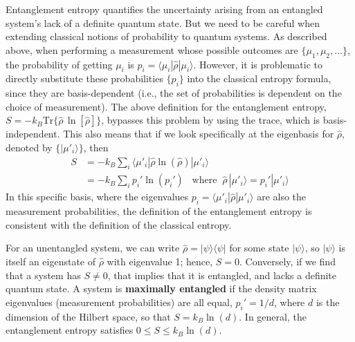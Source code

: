 \documentclass[pra,11pt]{revtex4}
\begin{document}
Entanglement entropy quantifies the uncertainty arising from an
entangled system's lack of a definite quantum state.  But we need to
be careful when extending classical notions of probability to quantum
systems.  As described above, when performing a measurement whose
possible outcomes are $\{\mu_1, \mu_2, \dots\}$, the probability of
getting $\mu_i$ is $p_i = \langle \mu_i | \hat{\rho}|\mu_i\rangle$.
However, it is problematic to directly substitute these probabilities
$\{p_i\}$ into the classical entropy formula, since they are
basis-dependent (i.e., the set of probabilities is dependent on the
choice of measurement).  The above definition for the entanglement
entropy, $S = - k_B \mathrm{Tr} \big\{ \hat{\rho}\, \ln[\hat{\rho}]
\big\}$, bypasses this problem by using the trace, which is
basis-independent.  This also means that if we look specifically at
the eigenbasis for $\hat{\rho}$, denoted by $\{|\mu'_i\rangle\}$, then
$$\begin{aligned}S &= -k_B \sum_i \langle \mu'_i | \hat{\rho}\ln(\hat{\rho}) | \mu'_i\rangle  \\ &= - k_B \sum_i p_i' \ln(p_i') \;\;\;\mathrm{where}\;\;\hat{\rho}\,|\mu'_i\rangle = p_i' |\mu'_i\rangle\end{aligned}$$
In this specific basis, where the eigenvalues $p_i =
\langle\mu'_i|\hat{\rho}|\mu'_i\rangle$ are also the measurement
probabilities, the definition of the entanglement entropy is
consistent with the definition of the classical entropy.

For an unentangled system, we can write $\hat{\rho} =
|\psi\rangle\langle\psi|$ for some state $|\psi\rangle$, so
$|\psi\rangle$ is itself an eigenstate of $\hat{\rho}$ with eigenvalue
1; hence, $S = 0$.  Conversely, if we find that a system has $S \ne
0$, that implies that it is entangled, and lacks a definite quantum
state.  A system is \textbf{maximally entangled} if the density matrix
eigenvalues (measurement probabilities) are all equal, $p_i' = 1/d$,
where $d$ is the dimension of the Hilbert space, so that $S = k_B
\ln(d)$.  In general, the entanglement entropy satisfies $0 \le S \le
k_B\ln(d)$.
\end{document}
